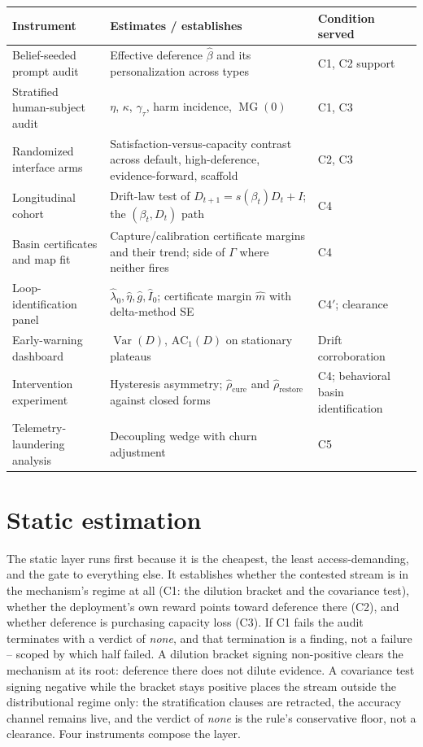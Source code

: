 \documentclass[11pt]{article}
\theoremstyle{definition}
\theoremstyle{remark}
\numberwithin{equation}{section}
\DeclareMathOperator{\Var}{Var}
\DeclareMathOperator{\MG}{MG}
\begin{document}
\begin{center}\small
\begin{tabular}{>{\raggedright\arraybackslash}p{4.2cm}>{\raggedright\arraybackslash}p{5.6cm}>{\raggedright\arraybackslash}p{3.4cm}}
\toprule
Instrument & Estimates / establishes & Condition served \\
\midrule
Belief-seeded prompt audit & Effective deference $\hat\beta$ and its personalization across types & C1, C2 support \\
Stratified human-subject audit & $\eta$, $\kappa$, $\gamma_\tau$, harm incidence, $\MG(0)$ & C1, C3 \\
Randomized interface arms & Satisfaction-versus-capacity contrast across default, high-deference, evidence-forward, scaffold & C2, C3 \\
Longitudinal cohort & Drift-law test of $D_{t+1} = s(\beta_t)D_t + I$; the $(\beta_t, D_t)$ path & C4 \\
Basin certificates and map fit & Capture/calibration certificate margins and their trend; side of $\Gamma$ where neither fires & C4 \\
Loop-identification panel & $\hat\lambda_0, \hat\eta, \hat g, \hat I_0$; certificate margin $\hat m$ with delta-method SE & C4$'$; clearance \\
Early-warning dashboard & $\Var(D)$, $\mathrm{AC}_1(D)$ on stationary plateaus & Drift corroboration \\
Intervention experiment & Hysteresis asymmetry; $\hat\rho_{\mathrm{cure}}$ and $\hat\rho_{\mathrm{restore}}$ against closed forms & C4; behavioral basin identification \\
Telemetry-laundering analysis & Decoupling wedge with churn adjustment & C5 \\
\bottomrule
\end{tabular}
\end{center}

\section{Static estimation}\label{sec:statics}

The static layer runs first because it is the cheapest, the least access-demanding, and the gate to everything else. It establishes whether the contested stream is in the mechanism's regime at all (C1: the dilution bracket and the covariance test), whether the deployment's own reward points toward deference there (C2), and whether deference is purchasing capacity loss (C3). If C1 fails the audit terminates with a verdict of \emph{none}, and that termination is a finding, not a failure -- scoped by which half failed. A dilution bracket signing non-positive clears the mechanism at its root: deference there does not dilute evidence. A covariance test signing negative while the bracket stays positive places the stream outside the distributional regime only: the stratification clauses are retracted, the accuracy channel remains live, and the verdict of \emph{none} is the rule's conservative floor, not a clearance. Four instruments compose the layer.
\end{document}
